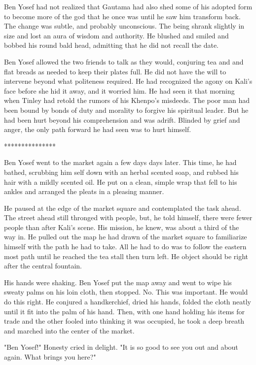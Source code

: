 \documentclass{amsart}
\begin{document}
Ben Yosef had not realized that Gautama had also shed some of his adopted form to become more of the god that he once was until he saw him transform back. The change was subtle, and probably unconscious. The being shrank slightly in size and lost an aura of wisdom and authority. He blushed and smiled and bobbed his round bald head, admitting that he did not recall the date.

Ben Yosef allowed the two friends to talk as they would, conjuring tea and and flat breads as needed to keep their plates full. He did not have the will to intervene beyond what politeness required. He had recognized the agony on Kali's face before she hid it away, and it worried him. He had seen it that morning when Tinley had retold the rumors of his Khenpo's misdeeds. The poor man had been bound by bonds of duty and morality to forgive his spiritual leader. But he had been hurt beyond his comprehension and was adrift. Blinded by grief and anger, the only path forward he had seen was to hurt himself.

\begin{center} *************** \end{center}

Ben Yosef went to the market again a few days days later. This time, he had bathed, scrubbing him self down with an herbal scented soap, and rubbed his hair with a mildly scented oil. He put on a clean, simple wrap that fell to his ankles and arranged the pleats in a pleasing manner. 

He paused at the edge of the market square and contemplated the task ahead. The street ahead still thronged with people, but, he told himself, there were fewer people than after Kali's scene. His mission, he knew, was about a third of the way in. He pulled out the map he had drawn of the market square to familiarize himself with the path he had to take. All he had to do was to follow the eastern most path until he reached the tea stall then turn left. He object should be right after the central fountain.

His hands were shaking. Ben Yosef put the map away and went to wipe his sweaty palms on his loin cloth, then stopped. No. This was important. He would do this right. He conjured a handkerchief, dried his hands, folded the cloth neatly until it fit into the palm of his hand. Then, with one hand holding his items for trade and the other fooled into thinking it was occupied, he took a deep breath and marched into the center of the market.

"Ben Yosef!" Honesty cried in delight. "It is so good to see you out and about again. What brings you here?"
\end{document}
